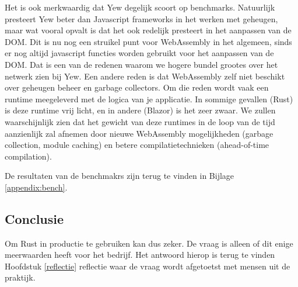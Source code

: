 Het is ook merkwaardig dat Yew degelijk scoort op benchmarks. Natuurlijk presteert Yew beter dan
Javascript frameworks in het werken met geheugen, maar wat vooral opvalt is dat het ook redelijk
presteert in het aanpassen van de DOM. Dit is nu nog een struikel punt voor WebAssembly in het
algemeen, sinds er nog altijd javascript functies worden gebruikt voor het aanpassen van de DOM.
Dat is een van de redenen waarom we hogere bundel grootes over het netwerk zien bij Yew.
Een andere reden is dat WebAssembly zelf niet beschikt over geheugen beheer en garbage collectors.
Om die reden wordt vaak een runtime meegeleverd met de logica van je applicatie. In sommige gevallen
(Rust) is deze runtime vrij licht, en in andere (Blazor) is het zeer zwaar. We zullen waarschijnlijk
zien dat het gewicht van deze runtimes in de loop van de tijd aanzienlijk zal afnemen door nieuwe
WebAssembly mogelijkheden (garbage collection, module caching) en betere compilatietechnieken
(ahead-of-time compilation).

De resultaten van de benchmakrs zijn terug te vinden in Bijlage \ref{appendix:bench}.

\subsection{Conclusie}

Om Rust in productie te gebruiken kan dus zeker. De vraag is alleen of dit enige meerwaarden heeft
voor het bedrijf. Het antwoord hierop is terug te vinden Hoofdstuk \ref{reflectie} reflectie waar
de vraag wordt afgetoetst met mensen uit de praktijk.
